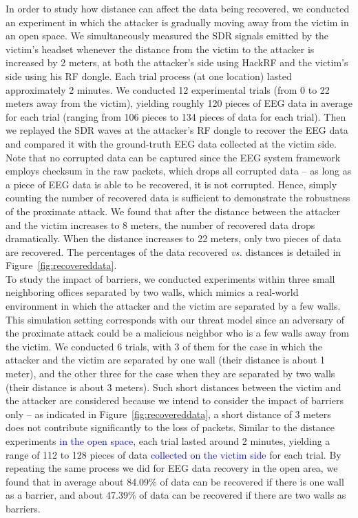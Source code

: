 In order to study how distance can affect the data being recovered, we conducted an experiment in which the attacker is gradually moving away from the victim in an open space. We simultaneously measured the SDR signals emitted by the victim's headset whenever the distance from the victim to the attacker is increased by 2 meters, at both the attacker's side using HackRF and the victim's side using his RF dongle. Each trial process (at one location) lasted approximately 2 minutes. We conducted 12 experimental trials (from 0 to 22 meters away from the victim), yielding roughly 120 pieces of EEG data in average for each trial (ranging from 106 pieces to 134 pieces of data for each trial). Then we replayed the SDR waves at the attacker's RF dongle to recover the EEG data and compared it with the ground-truth EEG data collected at the victim side. Note that no corrupted data can be captured since the EEG system framework employs checksum in the raw packets, which drops all corrupted data -- as long as a piece of EEG data is able to be recovered, it is not corrupted. Hence, simply counting the number of recovered data is sufficient to demonstrate the robustness of the proximate attack. We found that after the distance between the attacker and the victim increases to 8 meters, the number of recovered data drops dramatically. When the distance increases to 22 meters, only two pieces of data are recovered. The percentages of the data recovered \emph{vs.} distances is detailed in Figure~\ref{fig:recovereddata}. \\
\indent
To study the impact of barriers, we conducted experiments within three small neighboring offices separated by two walls, which mimics a real-world environment in which the attacker and the victim are separated by a few walls. This simulation setting corresponds with our threat model since an adversary of the proximate attack could be a malicious neighbor who is a few walls away from the victim. We conducted 6 trials, with 3 of them for the case in which the attacker and the victim are separated by one wall (their distance is about 1 meter), and the other three for the case when they are separated by two walls (their distance is about 3 meters). Such short distances between the victim and the attacker are considered because we intend to consider the impact of barriers only -- as indicated in Figure~\ref{fig:recovereddata}, a short distance of 3 meters does not contribute significantly to the loss of packets. Similar to the distance experiments \textcolor{blue}{in the open space}, each trial lasted around 2 minutes, yielding a range of 112 to 128 pieces of data \textcolor{blue}{collected on the victim side} for each trial. By repeating the same process we did for EEG data recovery in the open area, we found that in average about 84.09\% of data can be recovered if there is one wall as a barrier, and about 47.39\% of data can be recovered if there are two walls as barriers.

